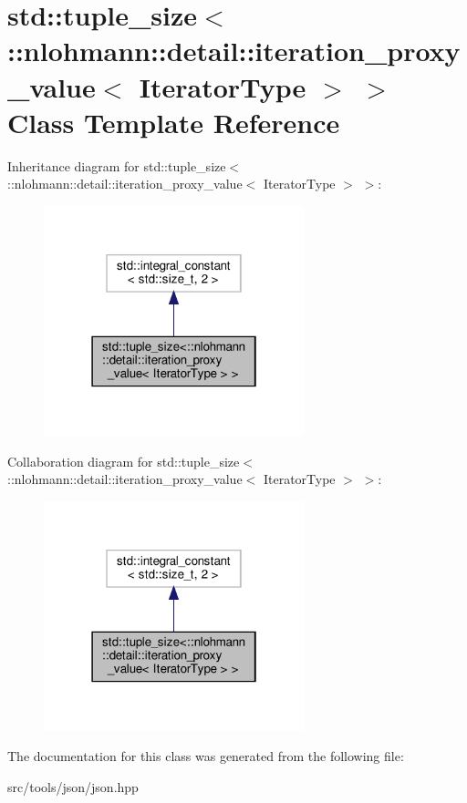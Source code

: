 \hypertarget{classstd_1_1tuple__size_3_1_1nlohmann_1_1detail_1_1iteration__proxy__value_3_01IteratorType_01_4_01_4}{}\section{std\+:\+:tuple\+\_\+size$<$\+:\+:nlohmann\+:\+:detail\+:\+:iteration\+\_\+proxy\+\_\+value$<$ Iterator\+Type $>$ $>$ Class Template Reference}
\label{classstd_1_1tuple__size_3_1_1nlohmann_1_1detail_1_1iteration__proxy__value_3_01IteratorType_01_4_01_4}


Inheritance diagram for std\+:\+:tuple\+\_\+size$<$\+:\+:nlohmann\+:\+:detail\+:\+:iteration\+\_\+proxy\+\_\+value$<$ Iterator\+Type $>$ $>$\+:
\nopagebreak
\begin{figure}[H]
\begin{center}
\leavevmode
\includegraphics[width=214pt]{classstd_1_1tuple__size_3_1_1nlohmann_1_1detail_1_1iteration__proxy__value_3_01IteratorType_01_4_01_4__inherit__graph}
\end{center}
\end{figure}


Collaboration diagram for std\+:\+:tuple\+\_\+size$<$\+:\+:nlohmann\+:\+:detail\+:\+:iteration\+\_\+proxy\+\_\+value$<$ Iterator\+Type $>$ $>$\+:
\nopagebreak
\begin{figure}[H]
\begin{center}
\leavevmode
\includegraphics[width=214pt]{classstd_1_1tuple__size_3_1_1nlohmann_1_1detail_1_1iteration__proxy__value_3_01IteratorType_01_4_01_4__coll__graph}
\end{center}
\end{figure}


The documentation for this class was generated from the following file\+:\begin{DoxyCompactItemize}
\item 
src/tools/json/json.\+hpp\end{DoxyCompactItemize}
